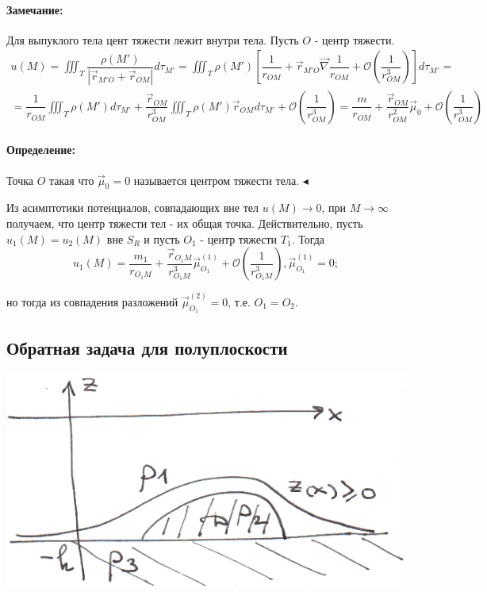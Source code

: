\documentclass{article}
\newenvironment{definition}{ \paragraph{Определение:}}{\hfill $\blacktriangleleft$}
\newenvironment{observation}{ \paragraph{Замечание:}}{}
\begin{document}
\begin{observation}
	Для выпуклого тела цент тяжести лежит внутри тела. Пусть $O$ - центр тяжести.
\begin{equation*}
\begin{split}
	u(M) = \iiint_T \dfrac{\rho(M')}{| \overrightarrow{r}_{M'O} + \overrightarrow{r}_{OM} |} d \tau_{M'} = 
	\iiint_T \rho(M') [ \dfrac{1}{r_{OM}} + \overrightarrow{r}_{M'O} \overrightarrow{\nabla} \dfrac{1}{r_{OM}} +
	\mathcal{O} (\dfrac{1}{r_{OM}^3})] d\tau_{M'} = \\
	= \dfrac{1}{r_{OM}} \iiint_T \rho(M') d \tau_{M'} + 
	\dfrac{\overrightarrow{r}_{OM}}{r_{OM}^3} \iiint_T \rho(M') \overrightarrow{r}_{OM} d \tau_{M'} +
	\mathcal{O} (\dfrac{1}{r_{OM}^3}) = 
	\dfrac{m}{r_{OM}} + \dfrac{\overrightarrow{r}_{OM}}{r_{OM}^2} \overrightarrow{\mu}_0 + \mathcal{O} (\dfrac{1}{r_{OM}^3})
\end{split}
\end{equation*}
\end{observation}

\begin{definition}
	Точка $O$ такая что $\overrightarrow{\mu}_0 = 0$ называется центром тяжести тела.
\end{definition}

Из асимптотики  потенциалов, совпадающих вне тел $u(M) \to 0$, при $M \to \infty$ получаем, что центр тяжести тел - их общая точка. 
Действительно, пусть $u_1(M) = u_2(M)$ вне $S_R$ и пусть $O_1$ - центр тяжести $T_1$. 
Тогда
\begin{equation*}
	u_1(M) = \dfrac{m_1}{r_{O_1M}} + \dfrac{\overrightarrow{r}_{O_1M}}{r_{O_1M}^3} \overrightarrow{\mu}_{O_1}^{(1)} + 
	\mathcal{O}(\dfrac{1}{r_{O_1M}^3}), 
	\overrightarrow{\mu}_{O_1}^{(1)} = 0;
\end{equation*}

но тогда из совпадения разложений $ \overrightarrow{\mu}_{O_1}^{(2)} = 0 $, т.е. $ O_1 = O_2 $.


\subsection*{Обратная задача для полуплоскости}

\vspace{0.5cm}
\includegraphics[scale=0.85]{pic3_2.png}
\end{document}
